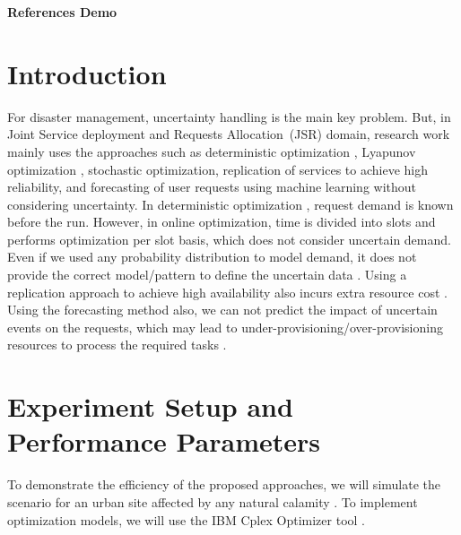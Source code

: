 \documentclass{article}
\begin{document}
\begin{center}
    \Large{\textbf{References Demo}}
\end{center}

\section{Introduction}

For disaster management, uncertainty handling is the main key problem. But, in Joint Service deployment and Requests Allocation~(JSR) domain, research work mainly uses the approaches such as deterministic optimization \cite{hardtoshare, multicell, bandwidth}, Lyapunov optimization \cite{dataintensive}, stochastic optimization, replication of services to achieve high reliability, and forecasting of user requests using machine learning without considering uncertainty. In deterministic optimization \cite{edgeuav}, request demand is known before the run. However, in online optimization, time is divided into slots and performs optimization per slot basis, which does not consider uncertain demand. Even if we used any probability distribution to model demand, it does not provide the correct model/pattern to define the uncertain data \cite{edgeuncertainty}. Using a replication approach to achieve high availability also incurs extra resource cost \cite{robust}. Using the forecasting method also, we can not predict the impact of uncertain events on the requests, which may lead to under-provisioning/over-provisioning resources to process the required tasks \cite{rsome}.

\section{Experiment Setup and Performance Parameters}
To demonstrate the efficiency of the proposed approaches, we will simulate the scenario for an urban site affected by any natural calamity \cite{oilindustry}. To implement optimization models, we will use the IBM Cplex Optimizer tool \cite{cplex}.



\end{document}

